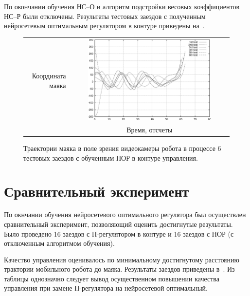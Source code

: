 По окончании обучения НС--О и алгоритм подстройки весовых
коэффициентов НС--Р были отключены.  Результаты тестовых заездов с
полученным нейросетевым оптимальным регулятором в контуре приведены
на~.

\begin{figure}
\centering
  \begin{tabular}{rc}
    \begin{sideways}
      {\hspace{3cm}\small Координата маяка}
    \end{sideways}
    &
    \includegraphics[width=0.8\textwidth,%
                     totalheight=0.35\textheight]{moby_fnnc_x01-06_test}\\
    & {\small Время, отсчеты} \\
\end{tabular}
\caption{Траектории маяка в поле зрения видеокамеры робота в процессе 6
тестовых заездов с обученным НОР в контуре управления.}
\label{fig:moby_fnnc_x01-06_test}
\end{figure}

\section{Сравнительный эксперимент}

По окнчании обучения нейросетевого оптимального регулятора был
осуществлен сравнительный эксперимент, позволяющий оценить достигнутые
результаты.  Было проведено 16 заездов с П-регулятором в контуре и 16
заездов с НОР (с отключенным алгоритмом обучения).

Качество управления оценивалось по минимальному достигнутому
расстоянию трактории мобильного робота до маяка.  Результаты заездов
приведены в~.  Из таблицы однозначно
следует вывод осущественном повышении качества управления при замене
П-регулятора на нейросетевой оптимальный.

